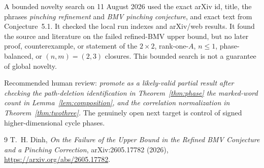 \documentclass[11pt]{article}
\begin{document}
A bounded novelty search on 11 August 2026 used the exact arXiv id, title,
the phrases \emph{pinching refinement} and \emph{BMV pinching conjecture},
and exact text from Conjecture~5.1. It checked the local run indexes and
arXiv/web results. It found the source and literature on the failed
refined-BMV upper bound, but no later proof, counterexample, or statement of
the \(2\times2\), rank-one-\(A\), \(n\leq1\), phase-balanced, or
\((n,m)=(2,3)\) closures.
This bounded search is not a guarantee of global novelty.

Recommended human review: \emph{promote as a likely-valid partial result
after checking the path-deletion identification in Theorem~\ref{thm:phase}
the marked-word count in Lemma~\ref{lem:composition}, and the correlation
normalization in Theorem~\ref{thm:twothree}.} The genuinely open next target
is control of signed higher-dimensional cycle phases.

\begin{thebibliography}{9}
T.~H. Dinh,
\emph{On the Failure of the Upper Bound in the Refined BMV Conjecture and a
Pinching Correction}, arXiv:2605.17782 (2026),
\url{https://arxiv.org/abs/2605.17782}.
\end{thebibliography}
\end{document}
